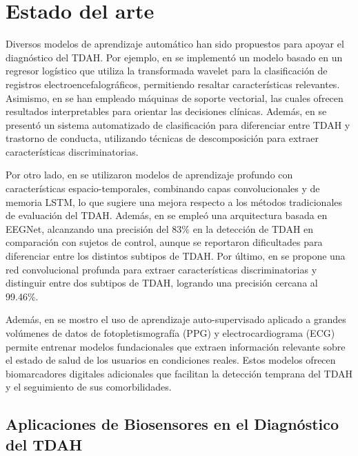 \section{Estado del arte}

Diversos modelos de aprendizaje automático han sido propuestos para apoyar el diagnóstico del TDAH. Por ejemplo, en \cite{10.1007/978-3-030-89691-1_41} se implementó un modelo basado en un regresor logístico que utiliza la transformada wavelet para la clasificación de registros electroencefalográficos, permitiendo resaltar características relevantes. Asimismo, en \cite{Vaidya202051} se han empleado máquinas de soporte vectorial, las cuales ofrecen resultados interpretables para orientar las decisiones clínicas. Además, en \cite{Tor2021} se presentó un sistema automatizado de clasificación para diferenciar entre TDAH y trastorno de conducta, utilizando técnicas de descomposición para extraer características discriminatorias.


Por otro lado, en \cite{Mao20191} se utilizaron modelos de aprendizaje profundo con características espacio-temporales, combinando capas convolucionales y de memoria LSTM, lo que sugiere una mejora respecto a los métodos tradicionales de evaluación del TDAH. Además, en \cite{Vahid2019} se empleó una arquitectura basada en EEGNet, alcanzando una precisión del 83\% en la detección de TDAH en comparación con sujetos de control, aunque se reportaron dificultades para diferenciar entre los distintos subtipos de TDAH. Por último, en \cite{AHMADI2021102227} se propone una red convolucional profunda para extraer características discriminatorias y distinguir entre dos subtipos de TDAH, logrando una precisión cercana al 99.46\%.



Además, en \cite{Abbaspourazad2024} se mostro el uso de aprendizaje auto-supervisado aplicado a grandes volúmenes de datos de fotopletismografía (PPG) y electrocardiograma (ECG) permite entrenar modelos fundacionales que extraen información relevante sobre el estado de salud de los usuarios en condiciones reales. Estos modelos ofrecen biomarcadores digitales adicionales que facilitan la detección temprana del TDAH y el seguimiento de sus comorbilidades.

\subsection{Aplicaciones de Biosensores en el Diagnóstico del TDAH}

